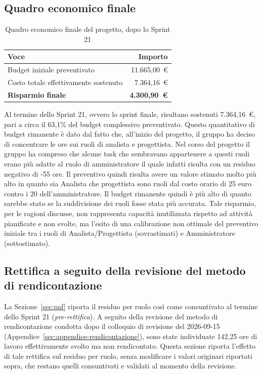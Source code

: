 \subsection{Quadro economico finale}

\begin{table}[H]
\centering
\renewcommand{\arraystretch}{1.3}
\begin{tabular}{l r}
\toprule
\textbf{Voce} & \textbf{Importo} \\
\midrule
Budget iniziale preventivato   & 11.665{,}00~\euro \\
Costo totale effettivamente sostenuto & 7.364{,}16~\euro \\
\midrule
\textbf{Risparmio finale}      & \textbf{4.300{,}90~\euro} \\
\bottomrule
\end{tabular}
\caption{Quadro economico finale del progetto, dopo lo Sprint 21}
\end{table}

Al termine dello Sprint 21, ovvero lo sprint finale, risultano sostenuti 7.364{,}16~\euro, pari a circa il 63,1\% del budget complessivo preventivato.
Questo quantitativo di budget rimanente è dato dal fatto che, all'inizio del progetto, il gruppo ha deciso di concentrare le ore sui 
ruoli di analista e progettista. Nel corso del progetto il gruppo ha compreso che alcune task che sembravano appartenere a questi ruoli erano 
più adatte al ruolo di amministratore il quale infatti risulta con un residuo negativo di -55 ore.
Il preventivo quindi risulta avere un valore stimato molto più alto in quanto sia Analista che progettista sono ruoli dal costo orario di 25 euro 
contro i 20 dell'amministratore. Il budget rimanente quindi è più alto di quanto sarebbe stato se la suddivisione dei ruoli fosse stata più accurata.
Tale risparmio, per le ragioni discusse, non rappresenta capacità
 inutilizzata rispetto ad attività pianificate e non svolte, ma l'esito di una calibrazione non ottimale del 
 preventivo iniziale tra i ruoli di Analista/Progettista (sovrastimati) e Amministratore (sottostimato).

\subsection{Rettifica a seguito della revisione del metodo di rendicontazione}
\label{sec:paf-rettifica}

La Sezione~\ref{sec:paf} riporta il residuo per ruolo così come consuntivato
al termine dello Sprint 21 (\textit{pre-rettifica}). A seguito della
revisione del metodo di rendicontazione condotta dopo il colloquio di
revisione del 2026-09-15 (Appendice~\ref{sec:appendice-rendicontazione}),
sono state individuate 142{,}25 ore di lavoro effettivamente svolto ma non
rendicontato. Questa sezione riporta l'effetto di tale rettifica sul
residuo per ruolo, senza modificare i valori originari riportati sopra, che
restano quelli consuntivati e validati al momento della revisione.

